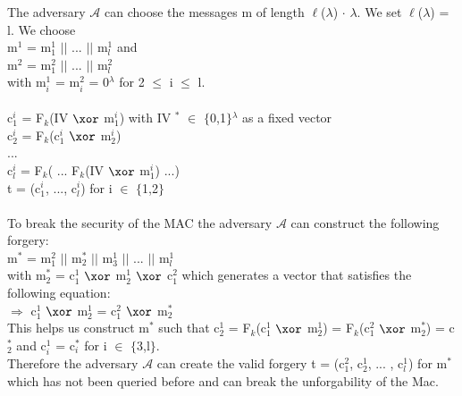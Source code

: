 \begin{itemize}
The adversary \(\mathcal{A}\) can choose the messages m of length \(\ell\)(\(\lambda\)) \(\cdot\) \(\lambda\). We set \(\ell\)(\(\lambda\)) = l. We choose \\
m\(^{1}\) = m\(_{1}^{1}\) \(\vert \vert\) ...  \(\vert \vert\)  m\(_{l}^{1}\) and\\ 
m\(^{2}\) = m\(_{1}^{2}\) \(\vert \vert\) ...  \(\vert \vert\)  m\(_{l}^{2}\) \\ with m\(_{i}^{1}\) = m\(_{i}^{2}\) =  0\(^{\lambda}\) for 2 \(\leq\) i \(\leq\) l.\\
\\
c\(_{1}^{i}\) = F\(_{k}\)(IV \(\xor\) m\(_{1}^{i}\)) with IV \(^{*}\) \(\in\) \(\{\)0,1\(\}\)\(^{\lambda}\) as a fixed vector \\
c\(_{2}^{i}\) = F\(_{k}\)(c\(_{1}^{i}\) \(\xor\) m\(_{2}^{i}\))\\
... \\
c\(_{l}^{i}\) = F\(_{k}\)( ... F\(_{k}\)(IV \(\xor\) m\(_{1}^{i}\)) ...) \\
t = (c\(_{1}^{i}\), ..., c\(_{l}^{i}\)) for i \(\in\) \(\{\)1,2\(\}\) \\
\\
To break the security of the MAC the adversary \(\mathcal{A}\) can construct the following forgery: \\
m\(^{*}\) =  m\(_{1}^{2}\) \(\vert \vert\) m\(_{2}^{*}\) \(\vert \vert\) m\(_{3}^{1}\) \(\vert \vert\) ...  \(\vert \vert\) m\(_{l}^{1}\) \\
with m\(_{2}^{*}\) = c\(_{1}^{1}\) \(\xor\) m\(_{2}^{1}\) \(\xor\) c\(_{1}^{2}\) which generates a vector that satisfies the following equation:\\
\(\Rightarrow\) c\(_{1}^{1}\) \(\xor\) m\(_{2}^{1}\) = c\(_{1}^{2}\) \(\xor\) m\(_{2}^{*}\)  \\
This helps us construct m\(^{*}\) such that c\(_{2}^{1}\) = F\(_{k}\)(c\(_{1}^{1}\) \(\xor\) m\(_{2}^{1}\)) = F\(_{k}\)(c\(_{1}^{2}\) \(\xor\) m\(_{2}^{*}\)) = c\(_{2}^{*}\) and c\(_{i}^{1}\) = c\(_{i}^{*}\) for i \(\in\) \(\{\)3,l\(\}\).\\
Therefore the adversary \(\mathcal{A}\) can create the valid forgery t = (c\(_{1}^{2}\), c\(_{2}^{1}\), ... , c\(_{l}^{1}\)) for m\(^{*}\) which has not been queried before and can break the unforgability of the Mac.

\end{itemize}
